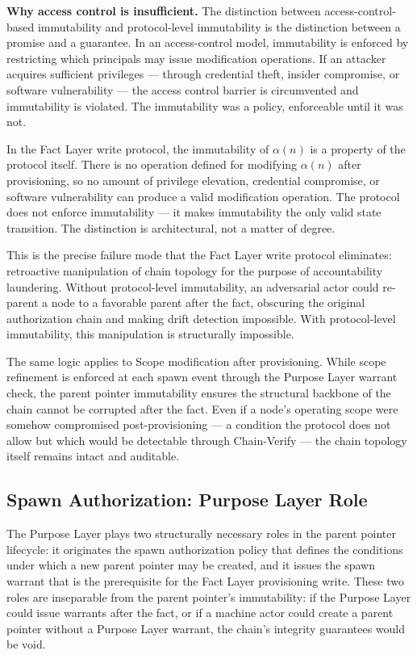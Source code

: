 \bigskip
\noindent\textbf{Why access control is insufficient.} The distinction between access-control-based immutability and protocol-level immutability is the distinction between a promise and a guarantee. In an access-control model, immutability is enforced by restricting which principals may issue modification operations. If an attacker acquires sufficient privileges --- through credential theft, insider compromise, or software vulnerability --- the access control barrier is circumvented and immutability is violated. The immutability was a policy, enforceable until it was not.

In the Fact Layer write protocol, the immutability of $\alpha(n)$ is a property of the protocol itself. There is no operation defined for modifying $\alpha(n)$ after provisioning, so no amount of privilege elevation, credential compromise, or software vulnerability can produce a valid modification operation. The protocol does not enforce immutability --- it makes immutability the only valid state transition. The distinction is architectural, not a matter of degree.

This is the precise failure mode that the Fact Layer write protocol eliminates: retroactive manipulation of chain topology for the purpose of accountability laundering. Without protocol-level immutability, an adversarial actor could re-parent a node to a favorable parent after the fact, obscuring the original authorization chain and making drift detection impossible. With protocol-level immutability, this manipulation is structurally impossible.

The same logic applies to Scope modification after provisioning. While scope refinement is enforced at each spawn event through the Purpose Layer warrant check, the parent pointer immutability ensures the structural backbone of the chain cannot be corrupted after the fact. Even if a node's operating scope were somehow compromised post-provisioning --- a condition the protocol does not allow but which would be detectable through Chain-Verify --- the chain topology itself remains intact and auditable.

\subsection{Spawn Authorization: Purpose Layer Role}
\label{sec:purpose-layer-authorization}

The Purpose Layer plays two structurally necessary roles in the parent pointer lifecycle: it originates the spawn authorization policy that defines the conditions under which a new parent pointer may be created, and it issues the spawn warrant that is the prerequisite for the Fact Layer provisioning write. These two roles are inseparable from the parent pointer's immutability: if the Purpose Layer could issue warrants after the fact, or if a machine actor could create a parent pointer without a Purpose Layer warrant, the chain's integrity guarantees would be void.

